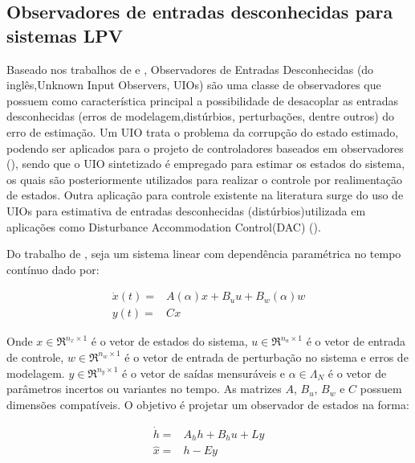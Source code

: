 \subsection{Observadores de entradas desconhecidas para sistemas LPV}
Baseado nos trabalhos de \cite{SilvaSinteseEstados} e \cite{Dias2022ItaloDias}, Observadores de Entradas Desconhecidas (do inglês,Unknown Input Observers, UIOs) são uma classe de observadores que possuem como característica principal a possibilidade de desacoplar as entradas desconhecidas (erros de modelagem,distúrbios, perturbações, dentre outros) do erro de estimação. Um UIO trata o problema da corrupção do estado estimado, podendo ser aplicados para o projeto de controladores baseados em observadores (\cite{Zasadzinski1995LoopTR}), sendo que o UIO sintetizado é empregado para estimar os estados do sistema, os quais são posteriormente utilizados para realizar o controle por realimentação de estados. Outra aplicação para controle existente na literatura surge do uso de UIOs para estimativa de entradas desconhecidas (distúrbios)utilizada em aplicações como Disturbance Accommodation Control(DAC) (\cite{Chen2016Disturbance-Observer-BasedOverview}).

Do trabalho de \cite{Dias2022ItaloDias}, seja um sistema linear com dependência paramétrica no tempo contínuo dado por:

\begin{equation}\label{eq:part_linsys}
  \begin{split}
    \dot{x}(t)=&A(\alpha)x+B_uu+B_w(\alpha)w\\
       y(t)=&Cx
  \end{split}
\end{equation}

Onde $x \in \Re^{n_{x} \times 1}$ é o vetor de estados do sistema, $u \in \Re^{n_{u} \times 1}$ é o vetor de entrada de controle, $w \in \Re^{n_{w} \times 1}$ é o vetor de entrada de perturbação no sistema e erros de modelagem. $y \in \Re^{n_{y} \times 1}$ é o vetor de saídas mensuráveis e $\alpha \in \Lambda_N$ é o vetor de parâmetros incertos ou variantes no tempo. As matrizes $A$, $B_u$, $B_w$ e $C$ possuem dimensões compatíveis.
O objetivo é projetar um observador de estados na forma:

\begin{equation}\label{eq:UIO}
  \begin{split}
    \dot{h}=&A_hh+B_hu+Ly\\
       \hat{x}=&h-Ey
  \end{split}
\end{equation}

